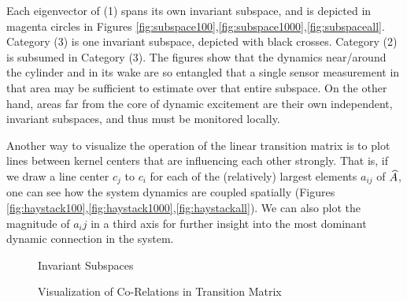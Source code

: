 Each eigenvector of (1) spans its own invariant subspace, and is depicted in magenta circles in Figures \ref{fig:subspace100},\ref{fig:subspace1000},\ref{fig:subspaceall}. Category (3) is one invariant subspace, depicted with black crosses. Category (2) is subsumed in Category (3). The figures show that the dynamics near/around the cylinder and in its wake are so entangled that a single sensor measurement in that area may be sufficient to estimate over that entire subspace. On the other hand, areas far from the core of dynamic excitement are their own independent, invariant subspaces, and thus must be monitored locally.

Another way to visualize the operation of the linear transition matrix is to plot lines between kernel centers that are influencing each other strongly. That is, if we draw a line center $c_j$ to $c_i$ for each of the (relatively) largest elements $a_{ij}$ of $\widehat{A}$, one can see how the system dynamics are coupled spatially (Figures \ref{fig:haystack100},\ref{fig:haystack1000},\ref{fig:haystackall}). We can also plot the magnitude of $a_ij$ in a third axis for further insight into the most dominant dynamic connection in the system.

\begin{figure*}[h] %
	\centering
	\caption{Invariant Subspaces}
\end{figure*}


\begin{figure}[h] %
	\centering
	\caption{Visualization of Co-Relations in Transition Matrix}
\end{figure}



